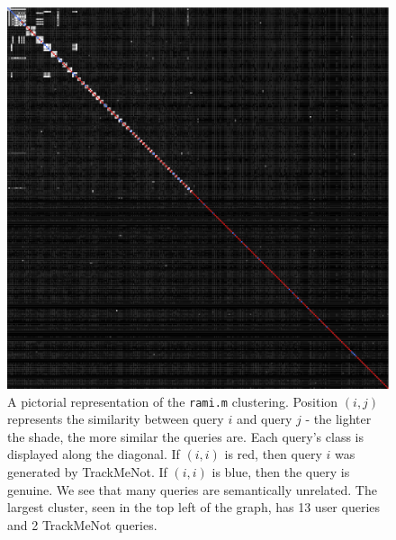\documentclass{llncs}
\begin{document}
\begin{multicols}{2}
  \begin{figure}[h]
    \centering
    \includegraphics[width=\linewidth]{disco_rami_305.png}
    \caption{A pictorial representation of the \texttt{rami.m}
      clustering. Position $(i,j)$ represents the similarity between
      query $i$ and query $j$ - the lighter the shade, the more
      similar the queries are. Each query's class is displayed along the
      diagonal. If $(i,i)$ is red, then query $i$ was generated by
      TrackMeNot. If $(i,i)$ is blue, then the query is genuine. We
      see that many queries are semantically unrelated. The largest
      cluster, seen in the top left of the graph, has 13 user queries and 2 TrackMeNot queries.}
    \label{fig:disco.rami}
  \end{figure}



\end{multicols}
\end{document}
